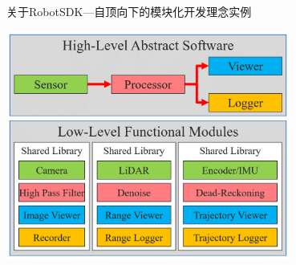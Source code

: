 \documentclass[9pt]{beamer}
\begin{document}
\begin{frame}[allowframebreaks]{关于RobotSDK---自顶向下的模块化开发理念实例}
\begin{center}
		\end{center}
		\begin{center}
			\includegraphics[width=0.7\textwidth]{./img/ex1-4}
		\end{center}
	\end{frame}
	
\end{document}
